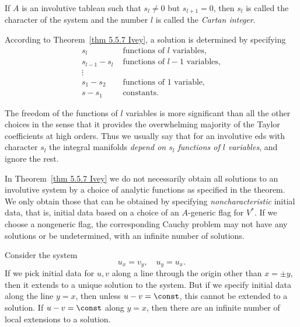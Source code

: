 \begin{defn}
    If $A$ is an involutive tableau such that $s_l\neq 0$ but $s_{l+1}=0$, then $s_l$ is called the character of the system and the number $l$ is called the \emph{Cartan integer}.
\end{defn}

According to Theorem~\ref{thm 5.5.7 Ivey}, a solution is determined by specifying 
\begin{align}
    s_l &\text{ functions of }l\text{ variables},\\
    s_{l-1}-s_l& \text{ functions of }l-1\text{ variables},\\
    \vdots &\\
    s_1-s_2&  \text{ functions of }1\text{ variable},\\
    s-s_1 & \text{ constants.}
\end{align}

The freedom of the functions of $l$ variables is more significant than all the other choices in the sense that it provides the overwhelming majority of the Taylor coefficients at high orders. Thus we usually say that for an involutive \gls{eds} with character $s_l$ the integral manifolds \emph{depend on $s_l$ functions of $l$ variables}, and ignore the rest.

In Theorem~\ref{thm 5.5.7 Ivey} we do not necessarily obtain all solutions to an involutive system by a choice of analytic functions as specified in the theorem. We only obtain those that can be obtained by specifying \emph{noncharacteristic} initial data, that is, initial data based on a choice of an $A$-generic flag for $V^\ast$. If we choose a nongeneric flag, the corresponding Cauchy problem may not have any solutions or be undetermined, with an infinite number of solutions.

\begin{example}\label{ex 5.6.1 Ivey}
    Consider the system 
    \[u_x=v_y,\quad u_y=u_x.\label{eq 5.20 Ivey}\]
    If we pick initial data for $u,v$ along a line through the origin other than $x=\pm y$, then it extends to a unique solution to the system. But if we specify initial data along the line $y=x$, then unless $u-v=\const$, this cannot be extended to a solution. If $u-v=\const$ along $y=x$, then there are an infinite number of local extensions to a solution.
\end{example}

